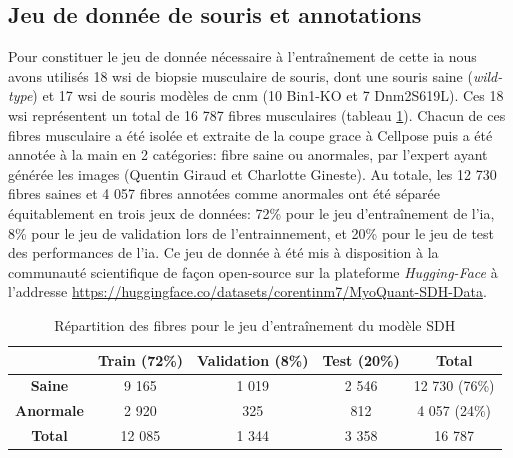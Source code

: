 \subsection{Jeu de donnée de souris et annotations}
Pour constituer le jeu de donnée nécessaire à l'entraînement de cette \gls{ia} nous avons utilisés 18 \gls{wsi} de biopsie musculaire de souris, dont une souris saine (\textit{wild-type}) et 17 \gls{wsi} de souris modèles de \gls{cnm} (10 Bin1-KO et 7 Dnm2S619L). Ces 18 \gls{wsi} représentent un total de 16 787 fibres musculaires (tableau \ref{tab:sdh_fiber_count}). Chacun de ces fibres musculaire a été isolée et extraite de la coupe grace à Cellpose puis a été annotée à la main en 2 catégories: fibre saine ou anormales, par l'expert ayant générée les images (Quentin Giraud et Charlotte Gineste). Au totale, les 12 730 fibres saines et 4 057 fibres annotées comme anormales ont été séparée équitablement en trois jeux de données: 72\% pour le jeu d'entraînement de l'\gls{ia}, 8\% pour le jeu de validation lors de l'entrainnement, et 20\% pour le jeu de test des performances de l'\gls{ia}. Ce jeu de donnée à été mis à disposition à la communauté scientifique de façon open-source sur la plateforme \textit{Hugging-Face} à l'addresse \href{https://huggingface.co/datasets/corentinm7/MyoQuant-SDH-Data}{https://huggingface.co/datasets/corentinm7/MyoQuant-SDH-Data}.

\begin{table}[ht]
\centering
\caption{Répartition des fibres pour le jeu d'entraînement du modèle SDH}
\label{tab:sdh_fiber_count}
\begin{tabular}{|c|c|c|c|c|}
\hline
 & \textbf{Train} (72\%) & \textbf{Validation} (8\%) & \textbf{Test} (20\%) & \textbf{Total} \\
\hline
\textbf{Saine} & 9 165 & 1 019 & 2 546 & 12 730 (76\%) \\
\hline
\textbf{Anormale} & 2 920 & 325 & 812 & 4 057 (24\%) \\
\hline
\hline
\textbf{Total} & 12 085 & 1 344 & 3 358 & 16 787 \\
\hline
\end{tabular}
\end{table}


